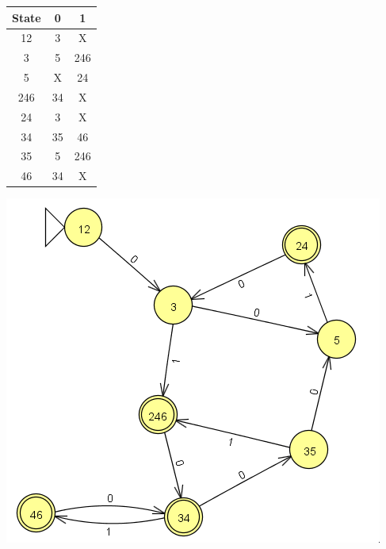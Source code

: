 \documentclass{article}
\begin{document}
        \begin{tabular}{|c|c|c|}
            \hline
            State & 0 & 1\\
            \hline
            12 & 3 & X\\
            \hline
            3 & 5 & 246\\
            \hline
            5 & X & 24\\
            \hline
            246 & 34 & X\\
            \hline
            24 & 3 & X\\
            \hline
            34 & 35 & 46\\
            \hline
            35 & 5 & 246\\
            \hline 
            46 & 34 & X\\
            \hline
        \end{tabular}
        \includegraphics[scale=0.75]{lastmachine}
\end{document}
